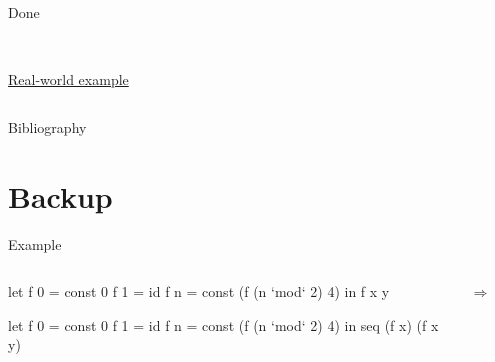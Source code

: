 \documentclass{haskellbeamer}
\begin{document}
\begin{frame}{Done}
\begin{columns}
\begin{column}{0.4\textwidth}
\begin{center}
        \\
        \href{https://github.com/sgraf812/ghc/blob/6f9f06c2d1bf3a9168ec4079ebf6da26398e54b9/compiler/simplCore/UsageAnal/Analysis.hs#L252}{Real-world example}
      \end{center}
    \end{column}
  \end{columns}
\end{frame}

\begin{frame}{Bibliography} 
  \printbibliography[heading=none]
\end{frame}

\section{Backup}

\begin{frame}[fragile]{Example}
  \begin{overprint}
    \begin{columns}
      \begin{column}{0.4\textwidth}
        \begin{overprint}
          \begin{haskell}
            let f 0 = const 0
                f 1 = id 
                f n = 
                  const (f (n `mod` 2) 4)
            in f x y
          \end{haskell}
          \begin{haskell}
            let f 0 = const 0
                f 1 = id 
                f n = 
                  const (f (n `mod` 2) 4)
            in seq (f x) (f x y)
          \end{haskell}
        \end{overprint}
      \end{column}
      \begin{column}{0.02\textwidth}
        {\Huge$\Rightarrow$}
      \end{column}
      \begin{column}{0.4\textwidth}
      \end{column}
    \end{columns}
  \end{overprint}
\end{frame}
\end{document}
